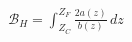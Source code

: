 \documentclass[preview]{standalone}
\begin{document}
\begin{align*}
\mathcal B_H=\int_{Z_C}^{Z_F}\frac{2a(z)}{b(z)}\,dz
\end{align*}
\end{document}
